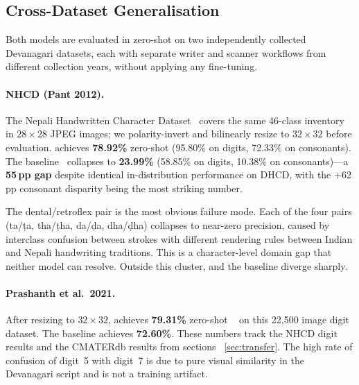 \subsection{Cross-Dataset Generalisation}
\label{sec:ood}

Both models are evaluated in zero-shot on two independently collected Devanagari datasets, each with separate writer and scanner workflows from different collection years, without applying any fine-tuning.

\paragraph{NHCD (Pant 2012).}
The Nepali Handwritten Character Dataset~\cite{pant2012nhcd} covers the same 46-class inventory in $28{\times}28$ JPEG images; we polarity-invert and bilinearly resize to $32{\times}32$ before evaluation.
\modelname{} achieves \textbf{78.92\%} zero-shot
(95.80\% on digits, 72.33\% on consonants).
The baseline~\cite{malla2025} collapses to \textbf{23.99\%}
(58.85\% on digits, 10.38\% on consonants)---a \textbf{55\,pp gap} despite
identical in-distribution performance on DHCD, with the +62\,pp consonant
disparity being the most striking number.

The dental/retroflex pair is the most obvious failure mode. Each of the four pairs (ta/\d{t}a, tha/\d{t}ha, da/\d{d}a, dha/\d{d}ha) collapses to near-zero precision, caused by interclass confusion between strokes with different rendering rules between Indian and Nepali handwriting traditions. This is a character-level domain gap that neither model can resolve. Outside this cluster, \modelname{} and the baseline diverge sharply.

\paragraph{Prashanth et al.\ 2021.} After resizing to $32{\times}32$, \modelname{} achieves \textbf{79.31\%} zero-shot ~\cite{prashanth2021} on this 22{,}500 image digit dataset. The baseline achieves \textbf{72.60\%}. These numbers track the NHCD digit results and the CMATERdb results from sections ~\ref{sec:transfer}. The high rate of confusion of digit~5 with digit~7 is due to pure visual similarity in the Devanagari script and is not a training artifact.

